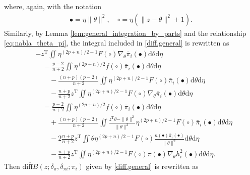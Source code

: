 \documentclass[preprint,11pt]{imsart}
\numberwithin{equation}{section}
\theoremstyle{plain}
\theoremstyle{definition}
\theoremstyle{remark}
\def\T{{ \mathrm{\scriptscriptstyle T} }}
\newcommand{\rd}{\mathrm{d}}
\newcommand{\oldiff}{\overline{\mathrm{diff}B}}
\begin{document}
where, again, with the notation  
\begin{align*}
 \bullet=\eta\|\theta\|^2, \quad \circ=\eta(\|z-\theta\|^2+1).
\end{align*}
Similarly, by Lemma \ref{lem:general_integration_by_parts} and the relationship
\eqref{eq:nabla_theta_pi}, the integral included in \eqref{diff.general}
is rewritten as
\begin{align*}
 & -z^\T\iint   \eta^{(2p+n)/2-1} F(\circ)
 \nabla_\theta\bar{\pi}_i(\bullet) \rd \theta   \rd \eta \\
 &\quad =\frac{p-2}{n+2}\iint   \eta^{(2p+n)/2} f(\circ)
 \bar{\pi}_i(\bullet) \rd \theta   \rd \eta \\
&\quad \quad -\frac{(n+p)(p-2)}{n+2}\iint   \eta^{(2p+n)/2-1} F(\circ)
 \bar{\pi}_i(\bullet) \rd \theta   \rd \eta \\
 &\quad \quad - \frac{n+p}{n+2}z^\T\iint   \eta^{(2p+n)/2-1} F(\circ)
 \nabla_\theta\bar{\pi}_i(\bullet) \rd \theta   \rd \eta \\
 &\quad =\frac{p-2}{n+2}\iint   \eta^{(2p+n)/2} f(\circ)
 \bar{\pi}_i(\bullet) \rd \theta   \rd \eta \\
&\quad \quad +\frac{(n+p)(p-2)}{n+2}\iint  \frac{z^\T\theta-\|\theta\|^2}{\|\theta\|^2} \eta^{(2p+n)/2-1} F(\circ)
 \bar{\pi}_i(\bullet) \rd \theta   \rd \eta \\
&\quad \quad -2\frac{n+p}{n+2}z^\T\iint  \theta\eta^{(2p+n)/2-1} F(\circ)
 \frac{\kappa(\bullet)\bar{\pi}_i(\bullet)}{\|\theta\|^2} \rd \theta   \rd \eta \\
 &\quad \quad - \frac{n+p}{n+2}z^\T\iint   \eta^{(2p+n)/2-1} F(\circ)
 \bar{\pi}(\bullet)\nabla_\theta h_i^2(\bullet) \rd \theta   \rd \eta .
\end{align*}
Then $\oldiff(z;\delta_\pi,\delta_{\pi i};\pi_i)$ given by \eqref{diff.general}
is rewritten as
\end{document}
